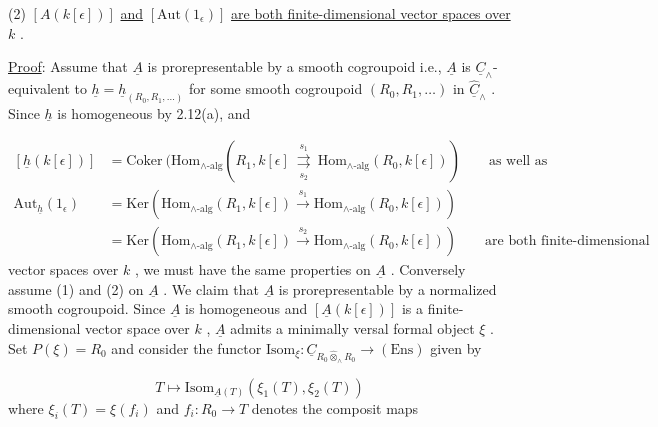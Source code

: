 (2)  $[A(k[\epsilon])]$  \underline{and}  $[\mathrm{Aut}(1_{\epsilon})]$  \underline{are both finite-dimensional vector spaces over}  $k$  .

\underline{Proof}:  Assume that  $\underline{A}$  is prorepresentable by a smooth cogroupoid i.e.,  $\underline{A}$  is  $\underline{C}_{\wedge}$-equivalent to  $\underline{h} = \underline{h}_{(R_{0},R_{1},\ldots)}$  for some smooth cogroupoid  $(R_{0},R_{1},\ldots)$  in  $\hat{\underline{C}}_{\wedge}$  . Since  $\underline{h}$  is homogeneous by 2.12(a), and

\begin{equation*}
\begin{aligned}
[\underline{h}(k[\epsilon])] &= \mathrm{Coker}\ (\mathrm{Hom}_{\wedge\text{-alg}}(R_{1},k[\epsilon] \ \underset{s_{2}}{\overset{s_{1}}{\rightrightarrows}}\ \mathrm{Hom}_{\wedge\text{-alg}}(R_{0},k[\epsilon])) \qquad \text{as well as} \\[2ex]
\mathrm{Aut}_{\underline{h}}(1_{\epsilon}) &= \mathrm{Ker}(\mathrm{Hom}_{\wedge\text{-alg}}(R_{1},k[\epsilon]) \xrightarrow{\ s_{1}\ } \mathrm{Hom}_{\wedge\text{-alg}}(R_{0},k[\epsilon])) \\[2ex]
&= \mathrm{Ker}(\mathrm{Hom}_{\wedge\text{-alg}}(R_{1},k[\epsilon]) \xrightarrow{\ s_{2}\ } \mathrm{Hom}_{\wedge\text{-alg}}(R_{0},k[\epsilon])) \qquad \text{are both finite-dimensional}
\end{aligned}
\end{equation*}
vector spaces over  $k$  , we must have the same properties on  $\underline{A}$  . Conversely assume (1) and (2) on  $\underline{A}$  . We claim that  $\underline{A}$  is prorepresentable by a normalized smooth cogroupoid. Since  $\underline{A}$  is homogeneous and  $[\underline{A}(k[\epsilon])]$  is a finite-dimensional vector space over  $k$  ,  $\underline{A}$  admits a minimally versal formal object  $\xi$  . Set  $P(\xi) = R_{0}$  and consider the functor  $\mathrm{Isom}_{\xi} : \underline{C}_{R_{0} \hat{\otimes}_{\wedge} R_{0}} \to (\mathrm{Ens})$  given by

\begin{equation*}
T \longmapsto \mathrm{Isom}_{\underline{A}(T)}(\xi_{1}(T),\xi_{2}(T))
\end{equation*}
where  $\xi_{i}(T) = \xi(f_{i})$  and  $f_{i} : R_{0} \to T$  denotes the composit maps

